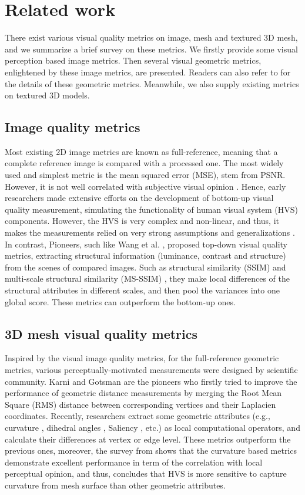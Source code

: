 \section{Related work}
There exist various visual quality metrics on image, mesh and textured 3D mesh, and we summarize a brief survey on these metrics. We firstly provide some visual perception based image metrics. Then several visual geometric metrics, enlightened by these image metrics, are presented. Readers can also refer to \cite{Corsini_2013} for the details of these geometric metrics.  Meanwhile, we also supply existing metrics on textured 3D models. 
\subsection{Image quality metrics}
Most existing 2D image metrics are known as full-reference, meaning that a complete reference image is compared with a processed one. The most widely used and simplest metric is the mean squared error (MSE), stem from PSNR. However, it is not well correlated with subjective visual opinion \cite{Snyder_1985} \cite{Teo}. Hence, early researchers \cite{Mannos_1974} made extensive efforts on the development of bottom-up visual quality measurement, simulating the functionality of human visual system (HVS) components. However, the HVS is very complex and non-linear, and thus, it makes the measurements relied on very strong assumptions and generalizations \cite{Baro_1995}\cite{Xing_2002}\cite{Ramos_2001}. In contrast, Pioneers, such like Wang et al. \cite{Wang_2004}, proposed  top-down visual quality metrics, extracting structural information (luminance, contrast and structure) from the scenes of compared images. Such as structural similarity (SSIM) \cite{Wang_2004} and multi-scale structural similarity (MS-SSIM) \cite{Zhou_Wang_2011}, they make local differences of the structural attributes in different scales, and then pool the variances into one global score. These metrics can outperform the bottom-up ones.
\subsection{3D mesh visual quality metrics}
Inspired by the visual image quality metrics, for the full-reference geometric metrics, various perceptually-motivated measurements were designed by scientific community.  Karni and Gotsman \cite{Karni_2000} are the pioneers who firstly tried to improve the performance of geometric distance measurements by merging the Root Mean Square (RMS) distance between corresponding vertices and their Laplacien coordinates. Recently, researchers extract some geometric attributes (e.g., curvature \cite{Lavou__2011}, dihedral angles \cite{V_a_2012}, Saliency \cite{Lee_2005}, etc.) as local computational operators, and calculate their differences at vertex or edge level. These metrics outperform the previous ones, moreover, the survey from \cite{Guo_2015} shows that the curvature based metrics demonstrate excellent performance  in term of the correlation with local perceptual opinion, and thus, concludes that HVS is more sensitive to capture curvature from mesh surface than other geometric attributes.
